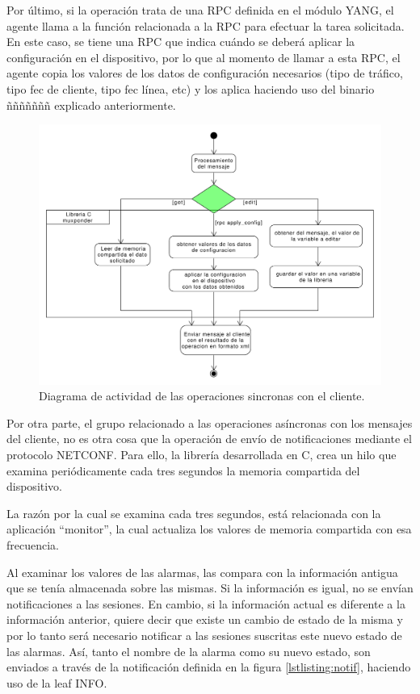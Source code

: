   Por último, si la operación trata de una RPC definida en el módulo YANG, el agente llama a la función relacionada a la RPC para efectuar la tarea solicitada. En este caso, se tiene una RPC que indica cuándo se deberá aplicar la configuración en el dispositivo, por lo que al momento de llamar a esta RPC, el agente copia los valores de los datos de configuración necesarios (tipo de tráfico, tipo fec de cliente, tipo fec línea, etc) y los aplica haciendo uso del binario ñññññññ explicado anteriormente.

  \begin{figure}[H]
    \centering
    \includegraphics[scale=0.45]{Figures/actividad_modulo_sinc.pdf}
    \caption{Diagrama de actividad de las operaciones sincronas con el cliente.}
    \label{fig:actividad_modulo_sinc}
  \end{figure}

  Por otra parte, el grupo relacionado a las operaciones asíncronas con los mensajes del cliente, no es otra cosa que la operación de envío de notificaciones mediante el protocolo NETCONF. Para ello, la librería desarrollada en C, crea un hilo que examina periódicamente cada tres segundos la memoria compartida del dispositivo. 
  
  La razón por la cual se examina cada tres segundos, está relacionada con la aplicación “monitor”, la cual actualiza los valores de memoria compartida con esa frecuencia.

  Al examinar los valores de las alarmas, las compara con la información antigua que se tenía almacenada sobre las mismas. Si la información es igual, no se envían notificaciones a las sesiones. En cambio, si la información actual es diferente a la información anterior, quiere decir que existe un cambio de estado de la misma y por lo tanto será necesario notificar a las sesiones suscritas este nuevo estado de las alarmas. Así, tanto el nombre de la alarma como su nuevo estado, son enviados a través de la notificación definida en la figura \ref{lstlisting:notif}, haciendo uso de la leaf INFO.
  
